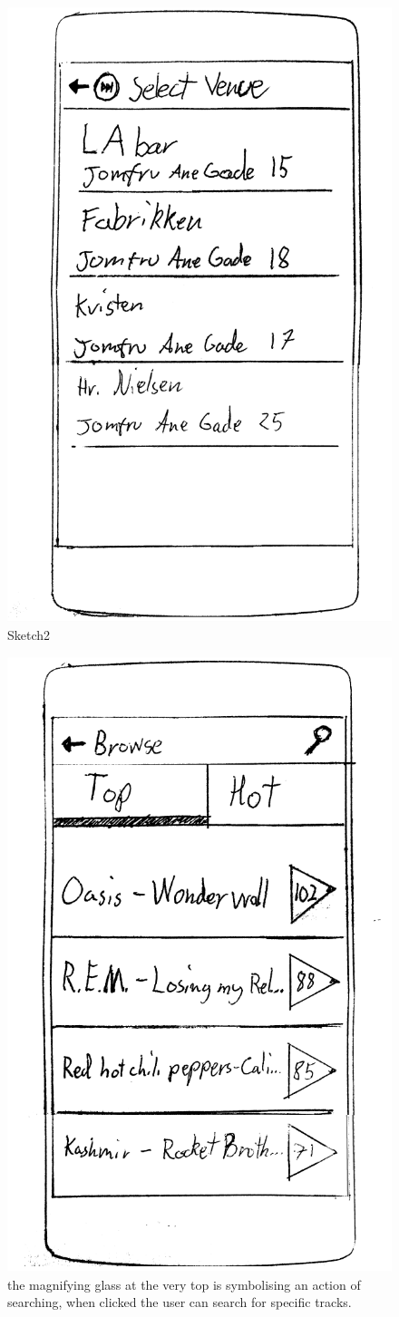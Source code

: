 \begin{figure}[hbtp]
  \centering
  \includegraphics[width=0.5\linewidth]{Images/sketch2.png}
  \caption{Sketch2}
  \label{fig:VenueSketch}
\end{figure}


\begin{figure}[hbtp]
  \centering
  \includegraphics[width=0.5\linewidth]{Images/sketch4.png}
  \caption{the magnifying glass at the very top is symbolising an action of searching, when clicked the user can search for specific tracks.}
  \label{fig:BrowseSketch}
\end{figure}
